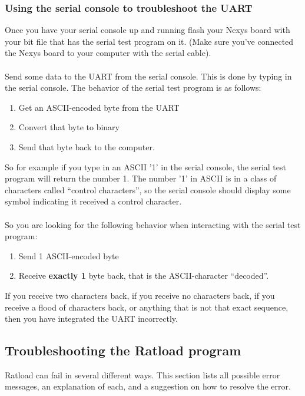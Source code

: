 \documentclass[notitlepage]{article}
\begin{document}
\subsubsection{Using the serial console to troubleshoot the UART}
Once you have your serial console up and running flash your Nexys board with your bit file that has the serial test program on it. (Make sure you've connected the Nexys board to your computer with the serial cable).\\\\
Send some data to the UART from the serial console. This is done by typing in the serial console. The behavior of the serial test program is as follows:
\begin{enumerate}
\item Get an ASCII-encoded byte from the UART
\item Convert that byte to binary
\item Send that byte back to the computer.
\end{enumerate}
So for example if you type in an ASCII '1' in the serial console, the serial test program will return the number 1. The number '1' in ASCII is in a class of characters called ``control characters'', so the serial console should display some symbol indicating it received a control character.\\\\
So you are looking for the following behavior when interacting with the serial test program:
\begin{enumerate}
\item Send 1 ASCII-encoded byte
\item Receive \textbf{exactly 1} byte back, that is the ASCII-character ``decoded''.
\end{enumerate}
If you receive two characters back, if you receive no characters back, if you receive a flood of characters back, or anything that is not that exact sequence, then you have integrated the UART incorrectly.

\subsection{Troubleshooting the Ratload program}
Ratload can fail in several different ways. This section lists all possible error messages, an explanation of each, and a suggestion on how to resolve the error.
\end{document}
